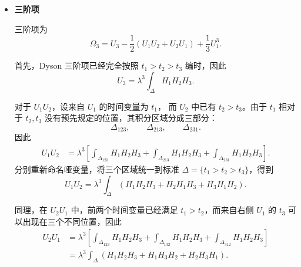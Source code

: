 \documentclass[UTF8,a4paper,11pt,openany]{ctexbook}
\begin{document}
\begin{itemize}
    因此，$\Omega_2$ 正是由不同时刻 Hamiltonian 的不对易性产生的第一项修正。

    \item \textbf{三阶项}

    三阶项为
    \begin{equation}
        \Omega_3
        =
        U_3
        -\frac12
        \left(
            U_1U_2+U_2U_1
        \right)
        +\frac13U_1^3.
    \end{equation}

    首先，Dyson 三阶项已经完全按照
    $t_1>t_2>t_3$ 编时，因此
    \begin{equation}
        U_3
        =
        \lambda^3
        \int_{\Delta}
        H_1H_2H_3.
    \end{equation}

    对于 $U_1U_2$，设来自 $U_1$ 的时间变量为 $t_1$，
    而 $U_2$ 中已有 $t_2>t_3$。由于 $t_1$ 相对于 $t_2,t_3$
    没有预先规定的位置，其积分区域分成三部分：
    \[
    \Delta_{123},
    \qquad
    \Delta_{213},
    \qquad
    \Delta_{231}.
    \]
    因此
    \begin{align}
        U_1U_2
        &=
        \lambda^3
        \left[
            \int_{\Delta_{123}}H_1H_2H_3
            +
            \int_{\Delta_{213}}H_1H_2H_3
            +
            \int_{\Delta_{231}}H_1H_2H_3
        \right].
    \end{align}
    分别重新命名哑变量，将三个区域统一到标准
    $\Delta=\{t_1>t_2>t_3\}$，得到
    \begin{equation}
        U_1U_2
        =
        \lambda^3
        \int_{\Delta}
        \left(
            H_1H_2H_3
            +H_2H_1H_3
            +H_3H_1H_2
        \right).
    \end{equation}

    同理，在 $U_2U_1$ 中，前两个时间变量已经满足
    $t_1>t_2$，而来自右侧 $U_1$ 的 $t_3$ 可以出现在三个不同位置，因此
    \begin{align}
        U_2U_1
        &=
        \lambda^3
        \left[
            \int_{\Delta_{123}}H_1H_2H_3
            +
            \int_{\Delta_{132}}H_1H_2H_3
            +
            \int_{\Delta_{312}}H_1H_2H_3
        \right]
        \nonumber\\
        &=
        \lambda^3
        \int_{\Delta}
        \left(
            H_1H_2H_3
            +H_1H_3H_2
            +H_2H_3H_1
        \right).
    \end{align}


\end{itemize}
\end{document}
